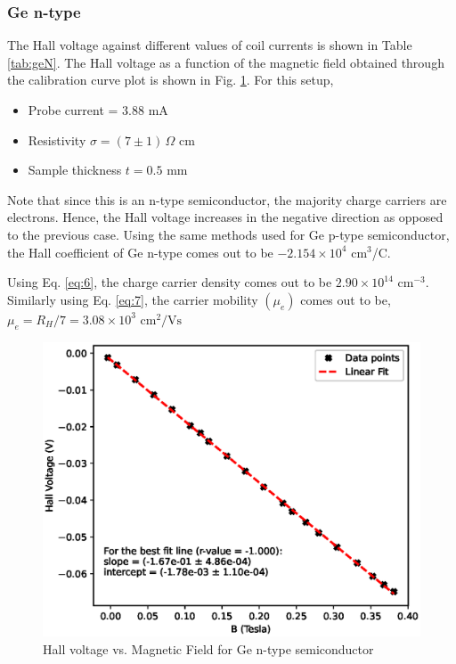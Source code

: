\subsubsection{Ge n-type}
The Hall voltage against different values of coil currents is shown in Table \ref{tab:geN}. The Hall voltage as a function of the magnetic field obtained through the calibration curve plot is shown in Fig. \ref{fig:geN}. For this setup,

\begin{itemize}
    \item Probe current = 3.88 mA
    \item Resistivity $\sigma = (7 \pm 1)\,\Omega$ cm 
    \item Sample thickness $t= 0.5$ mm\\
\end{itemize}

\noindent Note that since this is an n-type semiconductor, the majority charge carriers are electrons. Hence, the Hall voltage increases in the negative direction as opposed to the previous case. Using the same methods used for Ge p-type semiconductor, the Hall coefficient of Ge n-type comes out to be $-2.154 \times 10^4$ cm$^3$/C.

Using Eq. \ref{eq:6}, the charge carrier density comes out to be $2.90 \times 10^{14}$ cm$^{-3}$. Similarly using Eq. \ref{eq:7}, the carrier mobility $(\mu_e)$ comes out to be,
$\mu_e = R_H/7 = 3.08 \times 10^3 \text{ cm}^2/\text{Vs}$


\begin{figure}[H]
    \centering
    \includegraphics[width=1\columnwidth]{images/ge-n.eps}
    \caption{Hall voltage vs. Magnetic Field for Ge n-type semiconductor}
    \label{fig:geN}
\end{figure}


